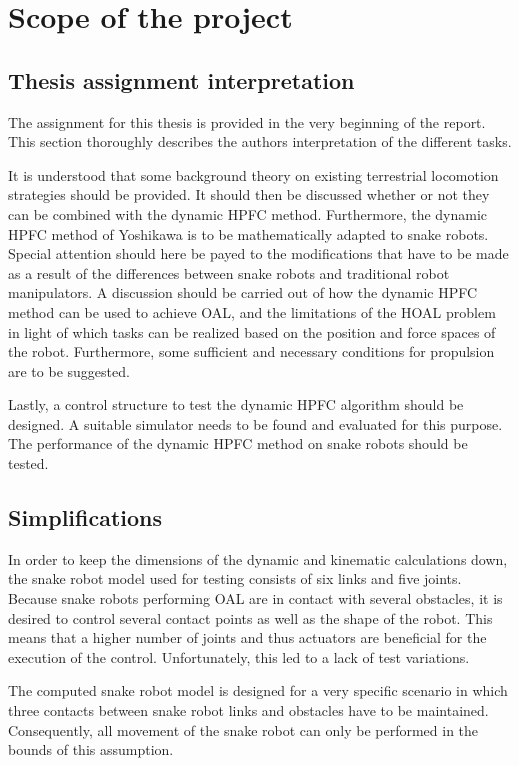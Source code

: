 \section{Scope of the project}

\subsection{Thesis assignment interpretation}

The assignment for this thesis is provided in the very beginning of the report. This section thoroughly describes the authors interpretation of the different tasks.

It is understood that some background theory on existing terrestrial locomotion strategies should be provided. It should then be discussed  whether or not they can be combined with the dynamic HPFC method.
Furthermore, the dynamic HPFC method of Yoshikawa \cite{yoshikawa1987dynamic} is to be mathematically adapted to snake robots. Special attention should here be payed to the modifications that have to be made as a result of the differences between snake robots and traditional robot manipulators. A discussion should be carried out of how the dynamic HPFC method can be used to achieve OAL, and the limitations of the HOAL problem in light of which tasks can be realized based on the position and force spaces of the robot. Furthermore, some sufficient and necessary conditions for propulsion are to be suggested.

Lastly, a control structure to test the dynamic HPFC algorithm should be designed. A suitable simulator needs to be found and evaluated for this purpose. The performance of the dynamic HPFC method on snake robots should be tested.


\subsection{Simplifications}

In order to keep the dimensions of the dynamic and kinematic calculations down, the snake robot model used for testing consists of six links and five joints. Because snake robots performing OAL are in contact with several obstacles, it is desired to control several contact points as well as the shape of the robot. This means that a higher number of joints and thus actuators are beneficial for the execution of the control. Unfortunately, this led to a lack of test variations.

The computed snake robot model is designed for a very specific scenario in which three contacts between snake robot links and obstacles have to be maintained. Consequently, all movement of the snake robot can only be performed in the bounds of this assumption. 

